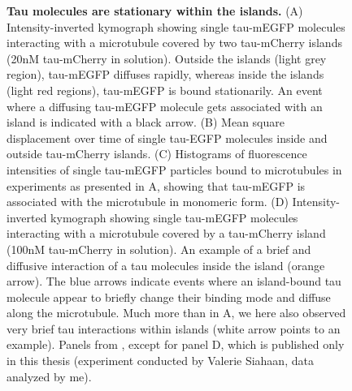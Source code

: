 \begin{figure}
{	\textbf{Tau molecules are stationary within the islands.} (A) Intensity-inverted kymograph showing single tau-mEGFP molecules interacting with a microtubule covered by two tau-mCherry islands (20nM tau-mCherry in solution). Outside the islands (light grey region), tau-mEGFP diffuses rapidly, whereas inside the islands (light red regions), tau-mEGFP is bound stationarily. An event where a diffusing tau-mEGFP molecule gets associated with an island is indicated with a black arrow. (B) Mean square displacement over time of single tau-EGFP molecules inside and outside tau-mCherry islands. (C) Histograms of fluorescence intensities of single tau-mEGFP particles bound to microtubules in experiments as presented in A, showing that tau-mEGFP is associated with the microtubule in monomeric form. (D) Intensity-inverted kymograph showing single tau-mEGFP molecules interacting with a microtubule covered by a tau-mCherry island (100nM tau-mCherry in solution). An example of a brief and diffusive interaction of a tau molecules inside the island (orange arrow). The blue arrows indicate events where an island-bound tau molecule appear to briefly change their binding mode and diffuse along the microtubule. Much more than in A, we here also observed very brief tau interactions within islands (white arrow points to an example). Panels from \cite{Siahaan2019a}, except for panel D, which is published only in this thesis (experiment conducted by Valerie Siahaan, data analyzed by me).
		}\label{tausingle}
\end{figure}
